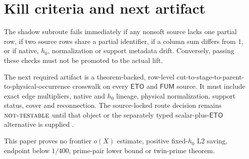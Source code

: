 \documentclass[11pt]{article}
\theoremstyle{definition}
\theoremstyle{remark}
\newcommand{\ETO}{\mathsf{ETO}}
\newcommand{\FUM}{\mathsf{FUM}}
\newcommand{\NT}{\textnormal{\textsc{not-testable}}}
\newcommand{\Ltwo}{\mathrm{L2}}
\begin{document}
\section{Kill criteria and next artifact}

The shadow subroute fails immediately if any nonsoft source lacks one
partial row, if two source rows share a partial identifier, if a
column sum differs from \(1\), or if native, \(h_0\), normalization
or support metadata drift.  Conversely, passing these checks must
not be promoted to the actual lift.

The next required artifact is a theorem-backed, row-level
cut-to-stage-to-parent-to-physical-occurrence crosswalk on every
\(\ETO\) and \(\FUM\) source.  It must include exact edge
multipliers, native and \(h_0\) lineage, physical normalization,
support status, cover and reconnection.  The source-locked route
decision remains \(\NT\) until that object or the separately typed
scalar-plus-\(\ETO\) alternative is supplied \citep{WangTPC152}.

This paper proves no frontier \(o(X)\) estimate, positive
fixed-\(h_0\) \(\Ltwo\) saving, endpoint below \(1/400\), prime-pair
lower bound or twin-prime theorem.

\begingroup
\small
\raggedright


\endgroup
\end{document}
